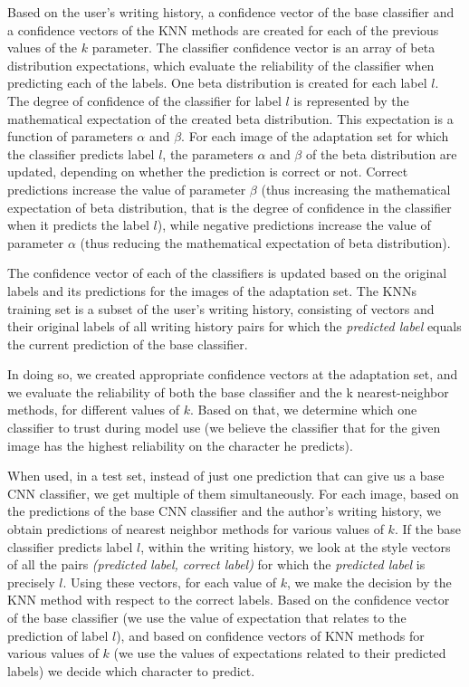 \documentclass{article}
\begin{document}
Based on the user's writing history, a confidence vector of the base classifier and a confidence vectors of the KNN methods are created for each of the previous values of the $k$ parameter. 
The classifier confidence vector is an array of beta distribution expectations, which evaluate the reliability of the classifier when predicting each of the labels. 
One beta distribution is created for each label $l$. 
The degree of confidence of the classifier for label $l$ is represented by the mathematical expectation of the created beta distribution. 
This expectation is a function of parameters $\alpha$  and $\beta$. 
For each image of the adaptation set for which the classifier predicts label $l$, the parameters $\alpha$  and $\beta$ of the beta distribution are updated, depending on whether the prediction is correct or not. 
Correct predictions increase the value of parameter $\beta$ 
(thus increasing the mathematical expectation of beta distribution, that is the degree of confidence in the classifier when it predicts the label $l$), 
while negative predictions increase the value of parameter $\alpha$ 
(thus reducing the mathematical expectation of beta distribution). 

The confidence vector of each of the classifiers is updated based on the original labels and its predictions for the images of the adaptation set. 
The KNNs training set is a subset of the user's writing history, consisting of vectors and their original labels of all writing history pairs for 
which the \textit{predicted label} equals the current prediction of the base classifier. 

In doing so, we created appropriate confidence vectors at the adaptation set, and we evaluate the reliability of both the base classifier and the k nearest-neighbor methods, for different values of $k$. 
Based on that, we determine which one classifier to trust during model use (we believe the classifier that for the given image has the highest reliability on the character he predicts). 

When used, in a test set, instead of just one prediction that can give us a base CNN classifier, we get multiple of them simultaneously. 
For each image, based on the predictions of the base CNN classifier and the author's writing history, we obtain predictions of nearest neighbor methods for various values of $k$. 
If the base classifier predicts label $l$, within the writing history, we look at the style vectors of all the pairs \textit{(predicted label, correct label)} for which the \textit{predicted label} is precisely $l$. 
Using these vectors, for each value of $k$, we make the decision by the KNN method with respect to the correct labels. 
Based on the confidence vector of the base classifier (we use the value of expectation that relates to the prediction of label $l$), and based on confidence vectors of KNN methods for various values of $k$ 
(we use the values of expectations related to their predicted labels) we decide which character to predict. 
\end{document}
